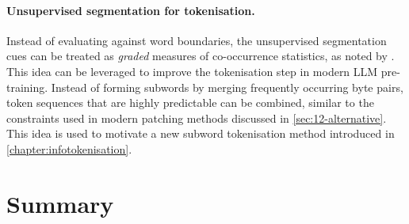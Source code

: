 \paragraph{Unsupervised segmentation for tokenisation.} Instead of evaluating against word boundaries, the unsupervised segmentation cues can be treated as \emph{graded} measures of co-occurrence statistics, as noted by \citet{elman-1990-finding}. This idea can be leveraged to improve the tokenisation step in modern LLM pre-training. Instead of forming subwords by merging frequently occurring byte pairs, token sequences that are highly predictable can be combined, similar to the constraints used in modern patching methods discussed in \cref{sec:12-alternative}. This idea is used to motivate a new subword tokenisation method introduced in \cref{chapter:infotokenisation}. 



\section{Summary}

